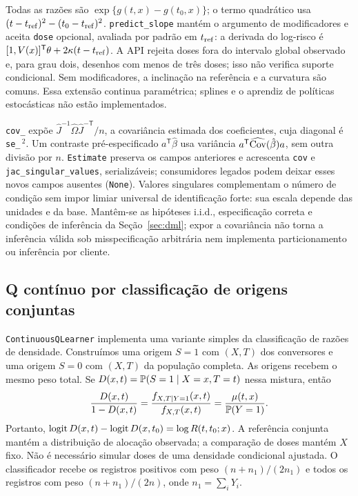 Todas as razões são $\exp\{g(t,x)-g(t_0,x)\}$; o termo quadrático usa $(t-t_{\rm ref})^2-(t_0-t_{\rm ref})^2$. \texttt{predict\_slope} mantém o argumento de modificadores e aceita \texttt{dose} opcional, avaliada por padrão em $t_{\rm ref}$: a derivada do log-risco é $[1,V(x)]^{\mathsf T}\theta+2\kappa(t-t_{\rm ref})$. A API rejeita doses fora do intervalo global observado e, para grau dois, desenhos com menos de três doses; isso não verifica suporte condicional. Sem modificadores, a inclinação na referência e a curvatura são comuns. Essa extensão continua paramétrica; splines e o aprendiz de políticas estocásticas não estão implementados.

\texttt{cov\_} expõe $\widehat J^{-1}\widehat\Omega\widehat J^{-\mathsf T}/n$, a covariância estimada dos coeficientes, cuja diagonal é \texttt{se\_}\,$^2$. Um contraste pré-especificado $a^{\mathsf T}\hat\beta$ usa variância $a^{\mathsf T}\widehat{\operatorname{Cov}}(\hat\beta)a$, sem outra divisão por $n$. \texttt{Estimate} preserva os campos anteriores e acrescenta \texttt{cov} e \texttt{jac\_singular\_values}, serializáveis; consumidores legados podem deixar esses novos campos ausentes (\texttt{None}). Valores singulares complementam o número de condição sem impor limiar universal de identificação forte: sua escala depende das unidades e da base. Mantêm-se as hipóteses i.i.d., especificação correta e condições de inferência da Seção~\ref{sec:dml}; expor a covariância não torna a inferência válida sob misspecificação arbitrária nem implementa particionamento ou inferência por cliente.

\subsection{Q contínuo por classificação de origens conjuntas}
\texttt{ContinuousQLearner} implementa uma variante simples da classificação de razões de densidade. Construímos uma origem $S=1$ com $(X,T)$ dos conversores e uma origem $S=0$ com $(X,T)$ da população completa. As origens recebem o mesmo peso total. Se $D(x,t)=\mathbb P(S=1\mid X=x,T=t)$ nessa mistura, então
\[
\frac{D(x,t)}{1-D(x,t)}
=\frac{f_{X,T\mid Y=1}(x,t)}{f_{X,T}(x,t)}
=\frac{\mu(t,x)}{\mathbb P(Y=1)}.
\]
Portanto, $\operatorname{logit} D(x,t)-\operatorname{logit} D(x,t_0)=\log R(t,t_0;x)$. A referência conjunta mantém a distribuição de alocação observada; a comparação de doses mantém $X$ fixo. Não é necessário simular doses de uma densidade condicional ajustada. O classificador recebe os registros positivos com peso $(n+n_1)/(2n_1)$ e todos os registros com peso $(n+n_1)/(2n)$, onde $n_1=\sum_iY_i$.

